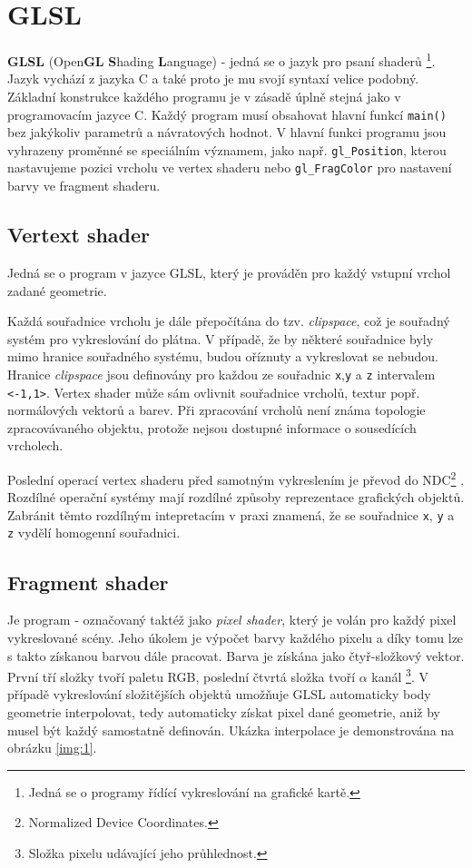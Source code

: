 \newpage

\section{GLSL}
\textbf{GLSL} (Open\textbf{GL} \textbf{S}hading \textbf{L}anguage) - jedná se o jazyk pro psaní shaderů \footnote{Jedná se o programy řídící vykreslování na grafické kartě.}. Jazyk vychází z jazyka C a také proto je mu svojí syntaxí velice podobný. Základní konstrukce každého programu je v zásadě úplně stejná jako v programovacím jazyce C. Každý program musí obsahovat hlavní funkcí \texttt{main()} bez jakýkoliv parametrů a návratových hodnot. V hlavní funkci programu jsou vyhrazeny proměnné se speciálním významem, jako např. \texttt{gl\_Position}, kterou nastavujeme  pozici vrcholu ve vertex shaderu nebo \texttt{gl\_FragColor} pro nastavení barvy ve fragment shaderu.

\subsection{Vertext shader}
Jedná se o program v jazyce GLSL, který je prováděn pro každý vstupní vrchol zadané geometrie. 

Každá souřadnice vrcholu je dále přepočítána do tzv. \textit{clipspace}, což je souřadný systém pro vykreslování do plátna. V případě, že by některé souřadnice byly mimo hranice souřadného systému, budou oříznuty a vykreslovat se nebudou. Hranice \textit{clipspace} jsou definovány pro každou ze souřadnic \texttt{x},\texttt{y} a \texttt{z} intervalem \texttt{<-1,1>}. Vertex shader může sám ovlivnit souřadnice vrcholů, textur popř. normálových vektorů a barev. Při zpracování vrcholů není známa topologie zpracovávaného objektu, protože nejsou dostupné informace o sousedících vrcholech. 

Poslední operací vertex shaderu před samotným vykreslením je převod do NDC\footnote{Normalized Device Coordinates.} \cite{opengl}. Rozdílné operační systémy mají rozdílné způsoby reprezentace grafických objektů. Zabránit těmto rozdílným  intepretacím v praxi znamená, že se souřadnice \texttt{x}, \texttt{y} a \texttt{z} vydělí homogenní souřadnici.

\subsection{Fragment shader}
Je program - označovaný taktéž jako \textit{pixel shader}, který je volán pro každý pixel vykreslované scény. Jeho úkolem je výpočet barvy každého pixelu a díky tomu lze s takto získanou barvou  dále pracovat. Barva je získána jako čtyř-složkový vektor. První tří složky tvoří paletu RGB, poslední čtvrtá složka tvoří $\alpha$ kanál \footnote{Složka pixelu udávající jeho průhlednost.}. V případě vykreslování složitějších objektů umožňuje GLSL automaticky body geometrie interpolovat, tedy automaticky získat pixel dané geometrie, aniž by musel být každý samostatně definován. Ukázka interpolace je demonstrována na obrázku \ref{img:1}.

